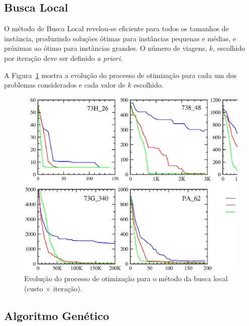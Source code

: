 
\subsection{Busca Local}
\label{sec:resultados_busca}

O método de Busca Local revelou-se eficiente para todos os tamanhos de instância, produzindo
soluções ótimas para instâncias pequenas e médias, e próximas ao ótimo para instâncias grandes. O
número de viagens, $k$, escolhido por iteração deve ser definido {\it a priori}. 

A Figura~\ref{fig:ls_results} mostra a evolução do processo de otimização para cada um dos problemas
considerados e cada valor de $k$ escolhido.

\begin{figure}[htbp]
	\begin{center}
		\includegraphics[scale=0.5]{fig/localsearch_results.eps}
		\caption{Evolução do processo de otimização para o método da busca local (custo $\times$ 
		iteração).}
		\label{fig:ls_results}
	\end{center}
\end{figure}


\subsection{Algoritmo Genético}
\label{sec:resultados_genetico}

